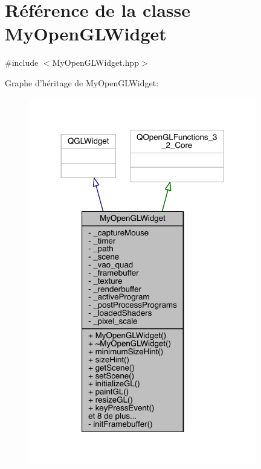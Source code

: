 \hypertarget{class_my_open_g_l_widget}{\section{Référence de la classe My\+Open\+G\+L\+Widget}
\label{class_my_open_g_l_widget}
}


{\ttfamily \#include $<$My\+Open\+G\+L\+Widget.\+hpp$>$}



Graphe d'héritage de My\+Open\+G\+L\+Widget\+:
\nopagebreak
\begin{figure}[H]
\begin{center}
\leavevmode
\includegraphics[width=282pt]{class_my_open_g_l_widget__inherit__graph}
\end{center}
\end{figure}


